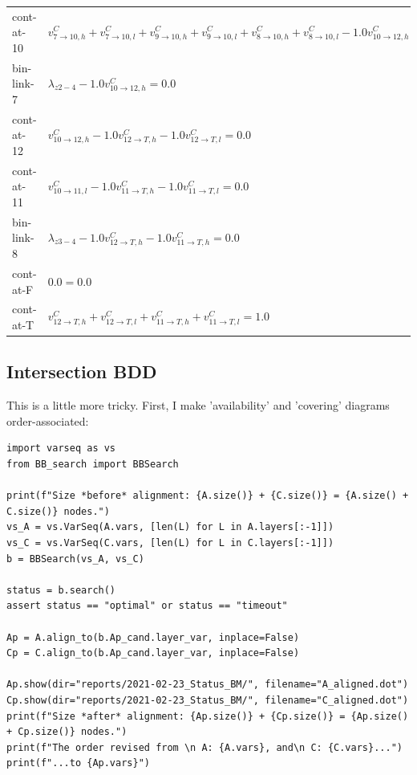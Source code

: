 \documentclass[11pt]{article}
\begin{document}
\begin{tabular}{l l}
    cont-at-10 & $v^C_{7 \rightarrow 10, h} + v^C_{7 \rightarrow 10, l} + v^C_{9 \rightarrow 10, h} + v^C_{9 \rightarrow 10, l} + v^C_{8 \rightarrow 10, h} + v^C_{8 \rightarrow 10, l} -1.0 v^C_{10 \rightarrow 12, h} -1.0 v^C_{10 \rightarrow 11, l} = 0.0$\\
    bin-link-7 & $\lambda_{z2-4} -1.0 v^C_{10 \rightarrow 12, h} = 0.0$\\
    cont-at-12 & $v^C_{10 \rightarrow 12, h} -1.0 v^C_{12 \rightarrow T, h} -1.0 v^C_{12 \rightarrow T, l} = 0.0$\\
    cont-at-11 & $v^C_{10 \rightarrow 11, l} -1.0 v^C_{11 \rightarrow T, h} -1.0 v^C_{11 \rightarrow T, l} = 0.0$\\
    bin-link-8 & $\lambda_{z3-4} -1.0 v^C_{12 \rightarrow T, h} -1.0 v^C_{11 \rightarrow T, h} = 0.0$\\
    cont-at-F & $0.0 = 0.0$\\
    cont-at-T & $v^C_{12 \rightarrow T, h} + v^C_{12 \rightarrow T, l} + v^C_{11 \rightarrow T, h} + v^C_{11 \rightarrow T, l} = 1.0$\\
\end{tabular}

\subsection{Intersection BDD}
\label{sec:org3092701}
This is a little more tricky. First, I make 'availability' and 'covering' diagrams order-associated:

\begin{verbatim}
import varseq as vs
from BB_search import BBSearch

print(f"Size *before* alignment: {A.size()} + {C.size()} = {A.size() + C.size()} nodes.")
vs_A = vs.VarSeq(A.vars, [len(L) for L in A.layers[:-1]])
vs_C = vs.VarSeq(C.vars, [len(L) for L in C.layers[:-1]])
b = BBSearch(vs_A, vs_C)

status = b.search()
assert status == "optimal" or status == "timeout"

Ap = A.align_to(b.Ap_cand.layer_var, inplace=False)
Cp = C.align_to(b.Ap_cand.layer_var, inplace=False)

Ap.show(dir="reports/2021-02-23_Status_BM/", filename="A_aligned.dot")
Cp.show(dir="reports/2021-02-23_Status_BM/", filename="C_aligned.dot")
print(f"Size *after* alignment: {Ap.size()} + {Cp.size()} = {Ap.size() + Cp.size()} nodes.")
print(f"The order revised from \n A: {A.vars}, and\n C: {C.vars}...")
print(f"...to {Ap.vars}")
\end{verbatim}
\end{document}

